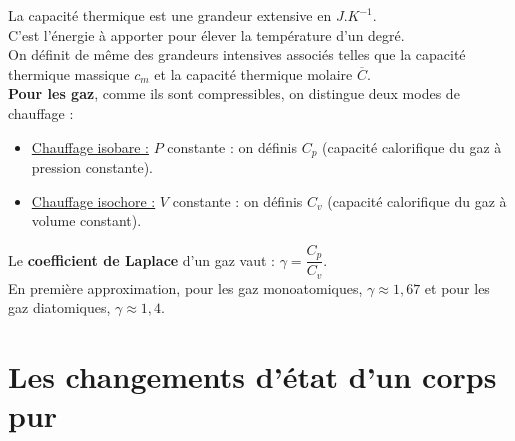 \documentclass[13pt, twoside, a4paper, french]{report}
\begin{document}
            La capacité thermique est une grandeur extensive en $J.K^{-1}$.\\
            C'est l'énergie à apporter pour élever la température d'un degré.
            \vspace{7pt}\\
            On définit de même des grandeurs intensives associés telles que la capacité thermique massique $c_m$ et la capacité thermique molaire $\overline{C}$.\\

            \textbf{Pour les gaz}, comme ils sont compressibles, on distingue deux modes de chauffage :
            \vspace{3pt}
            \begin{itemize}
                \item \underline{Chauffage isobare :} $P$ constante : on définis $C_p$ (capacité calorifique du gaz à pression constante).
                \item \underline{Chauffage isochore :} $V$ constante : on définis $C_v$ (capacité calorifique du gaz à volume constant).
            \end{itemize}
            \vspace{5pt}
            Le \textbf{coefficient de Laplace} d'un gaz vaut : $\gamma = \dfrac{C_p}{C_v}$.\\
            En première approximation, pour les gaz monoatomiques, $\gamma \approx 1,67$ et pour les gaz diatomiques, $\gamma \approx 1,4$.


        \section{Les changements d’état d’un corps pur}\label{sec:les-changements-detat-dun-corps-pur}
\end{document}
